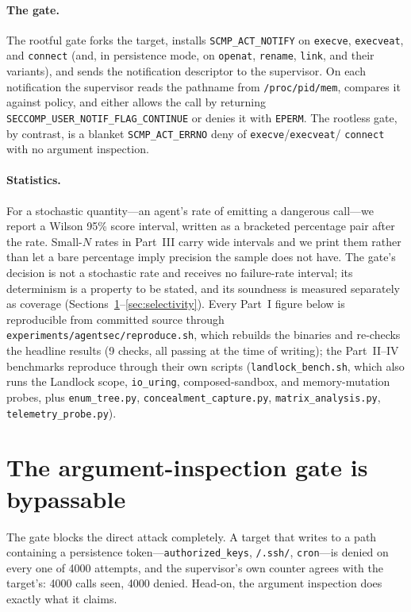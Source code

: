\documentclass[11pt]{article}
\newcommand{\Nrace}{4000}
\begin{document}
\paragraph{The gate.} The rootful gate forks the target, installs \texttt{SCMP\_ACT\_NOTIFY} on
\texttt{execve}, \texttt{execveat}, and \texttt{connect} (and, in persistence mode, on
\texttt{openat}, \texttt{rename}, \texttt{link}, and their variants), and sends the notification
descriptor to the supervisor. On each notification the supervisor reads the pathname from
\texttt{/proc/pid/mem}, compares it against policy, and either allows the call by returning
\texttt{SECCOMP\_USER\_NOTIF\_FLAG\_CONTINUE} or denies it with \texttt{EPERM}. The rootless gate,
by contrast, is a blanket \texttt{SCMP\_ACT\_ERRNO} deny of \texttt{execve}/\texttt{execveat}/%
\texttt{connect} with no argument inspection.

\paragraph{Statistics.} For a stochastic quantity---an agent's rate of emitting a dangerous
call---we report a Wilson 95\% score interval, written as a bracketed percentage pair after the rate.
Small-$N$ rates in Part~III carry wide intervals and we print them rather than let a bare percentage
imply precision the sample does not have. The gate's decision is not a stochastic rate and receives
no failure-rate interval; its determinism is a property to be stated, and its soundness is measured
separately as coverage (Sections~\ref{sec:toctou}--\ref{sec:selectivity}). Every Part~I figure below is
reproducible from committed source through \texttt{experiments/agentsec/reproduce.sh}, which rebuilds the
binaries and re-checks the headline results (9 checks, all passing at the time of writing); the Part~II--IV
benchmarks reproduce through their own scripts (\texttt{landlock\_bench.sh}, which also runs
the Landlock scope, \texttt{io\_uring}, composed-sandbox, and memory-mutation probes, plus \texttt{enum\_tree.py},
\texttt{concealment\_capture.py}, \texttt{matrix\_analysis.py}, \texttt{telemetry\_probe.py}).

\section{The argument-inspection gate is bypassable}\label{sec:toctou}

The gate blocks the direct attack completely. A target that writes to a path containing a
persistence token---\texttt{authorized\_keys}, \texttt{/.ssh/}, \texttt{cron}---is denied on every
one of \Nrace{} attempts, and the supervisor's own counter agrees with the target's: \Nrace{} calls
seen, \Nrace{} denied. Head-on, the argument inspection does exactly what it claims.
\end{document}
